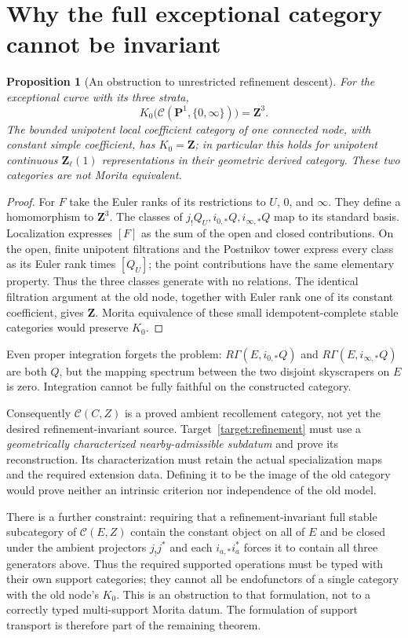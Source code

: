 \documentclass[11pt]{article}
\newtheorem{proposition}[theorem]{Proposition}
\theoremstyle{definition}
\theoremstyle{remark}
\begin{document}
\section{Why the full exceptional category cannot be invariant}
\begin{proposition}[An obstruction to unrestricted refinement descent]
\label{prop:K0-obstruction}
For the exceptional curve with its three strata,
\[
 K_0\bigl(\mathcal C(\mathbf P^1,\{0,\infty\})\bigr)=\mathbf Z^3.
\]
The bounded unipotent local coefficient category of one connected
node, with constant simple coefficient, has $K_0=\mathbf Z$; in
particular this holds for unipotent continuous $\mathbf Z_\ell(1)$
representations in their geometric derived category.  These two
categories are not Morita equivalent.
\end{proposition}
\begin{proof}
For $F$ take the Euler ranks of its restrictions to $U$, $0$, and
$\infty$.  They define a homomorphism to $\mathbf Z^3$.  The classes
of $j_!Q_U,i_{0,*}Q,i_{\infty,*}Q$ map to its standard basis.
Localization expresses $[F]$ as the sum of the open and closed
contributions.  On the open, finite unipotent filtrations and the
Postnikov tower express every class as its Euler rank times $[Q_U]$;
the point contributions have the same elementary property.  Thus the
three classes generate with no relations.  The identical filtration
argument at the old node, together with Euler rank one of its constant
coefficient, gives $\mathbf Z$.  Morita equivalence of these small
idempotent-complete stable categories would preserve $K_0$.
\end{proof}
Even proper integration forgets the problem: $R\Gamma(E,i_{0,*}Q)$ and
$R\Gamma(E,i_{\infty,*}Q)$ are both $Q$, but the mapping spectrum between
the two disjoint skyscrapers on $E$ is zero.  Integration cannot be
fully faithful on the constructed category.

Consequently $\mathcal C(C,Z)$ is a proved ambient recollement category,
not yet the desired refinement-invariant source.  Target~\ref{target:refinement}
must use a \emph{geometrically characterized nearby-admissible subdatum}
and prove its reconstruction.  Its characterization must retain the
actual specialization maps and the required extension data.  Defining
it to be the image of the old category would prove neither an intrinsic
criterion nor independence of the old model.

There is a further constraint: requiring that a refinement-invariant
full stable subcategory of $\mathcal C(E,Z)$ contain the constant object on all of $E$ and be closed
under the ambient projectors $j_!j^*$ and each $i_{a,*}i_a^*$ forces it
to contain all three generators above.  Thus the required supported
operations must be typed with their own support categories; they cannot
all be endofunctors of a single category with the old node's $K_0$.
This is an obstruction to that formulation, not to a correctly typed
multi-support Morita datum.  The formulation of support transport is
therefore part of the remaining theorem.
\end{document}
